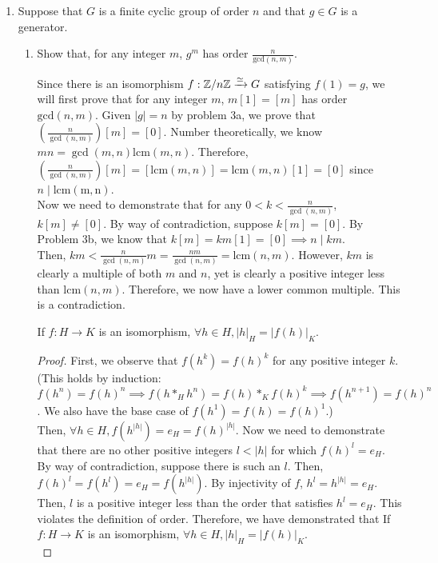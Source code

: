 \documentclass{amsart}
\begin{document}
\begin{enumerate}[itemsep=0.4in]
\item Suppose that $G$ is a finite cyclic group of order $n$ and that $g\in G$ is a generator.
\begin{enumerate}
	\item Show that, for any integer $m$, $g^m$ has order $\frac{n}{\mathrm{gcd}(n,m)}$.

        Since there is an isomorphism $f:\mathbb{Z}/n\mathbb{Z}\xrightarrow{\simeq}G$ satisfying $f(1) = g$, we will first prove that for any integer $m$, $m[1]=[m]$ has order $\mathrm{gcd}(n,m)$. Given $|g|=n$ by problem 3a, we prove that $(\frac n{\gcd(n,m)})[m]=[0]$. Number theoretically, we know $mn=\gcd(m,n)\mathrm{lcm}(m,n)$. Therefore, $(\frac n{\gcd(n,m)})[m]=[\mathrm{lcm}(m,n)]=\mathrm{lcm}(m,n)[1]=[0]$ since $n\mid\mathrm{lcm(m,n)}$.\\

        Now we need to demonstrate that for any $0<k<\frac n{\gcd(n,m)}$, $k[m]\neq[0]$. By way of contradiction, suppose $k[m]=[0]$. By Problem 3b, we know that $k[m]=km[1]=[0]\implies n\mid km$.\\
        
        Then, $km<\frac n{\gcd(n,m)}m=\frac{nm}{\gcd(n,m)}=\mathrm{lcm}(n,m)$. However, $km$ is clearly a multiple of both $m$ and $n$, yet is clearly a positive integer less than $\mathrm{lcm}(n,m)$. Therefore, we now have a lower common multiple. This is a contradiction.\\

        \begin{lemma}
            If $f:H\to K$ is an isomorphism, $\forall h\in H,|h|_H=|f(h)|_K$.
        \end{lemma}

        \begin{proof}
            First, we observe that $f(h^k)=f(h)^k$ for any positive integer $k$. (This holds by induction: $f(h^n)=f(h)^n\implies f(h*_Hh^n)=f(h)*_Kf(h)^k\implies f(h^{n+1})=f(h)^n$. We also have the base case of $f(h^1)=f(h)=f(h)^1$.)\\

            Then, $\forall h\in H,f(h^{|h|})=e_H=f(h)^{|h|}$. Now we need to demonstrate that there are no other positive integers $l<|h|$ for which $f(h)^{l}=e_H$. By way of contradiction, suppose there is such an $l$. Then, $f(h)^l=f(h^l)=e_H=f(h^{|h|})$. By injectivity of $f$, $h^l=h^{|h|}=e_H$. Then, $l$ is a positive integer less than the order that satisfies $h^l=e_H$. This violates the definition of order. Therefore, we have demonstrated that If $f:H\to K$ is an isomorphism, $\forall h\in H,|h|_H=|f(h)|_K$.\\
        \end{proof}
        

\end{enumerate}
\end{enumerate}
\end{document}
